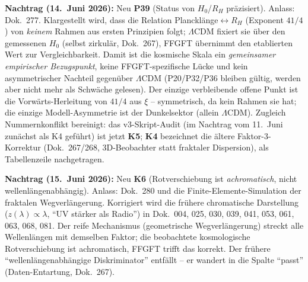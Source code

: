 \textbf{Nachtrag (14.~Juni 2026):} Neu \textbf{P39} (Status von $H_0$/$R_H$
präzisiert). Anlass: Dok.~277. Klargestellt wird, dass die Relation
Plancklänge$\leftrightarrow R_H$ (Exponent $41/4$) von \emph{keinem} Rahmen aus
ersten Prinzipien folgt; $\Lambda$CDM fixiert sie über den gemessenen $H_0$
(selbst zirkulär, Dok.~267), FFGFT übernimmt den etablierten Wert zur
Vergleichbarkeit. Damit ist die kosmische Skala ein \emph{gemeinsamer
empirischer Bezugspunkt}, keine FFGFT-spezifische Lücke und kein asymmetrischer
Nachteil gegenüber $\Lambda$CDM (P20/P32/P36 bleiben gültig, werden aber nicht
mehr als Schwäche gelesen). Der einzige verbleibende offene Punkt ist die
Vorwärts-Herleitung von $41/4$ aus $\xi$ -- symmetrisch, da kein Rahmen sie
hat; die einzige Modell-Asymmetrie ist der Dunkelsektor (allein $\Lambda$CDM).
Zugleich Nummernkonflikt bereinigt: das v3-Skript-Audit (im Nachtrag vom
11.~Juni zunächst als K4 geführt) ist jetzt \textbf{K5}; \textbf{K4} bezeichnet
die ältere Faktor-3-Korrektur (Dok.~267/268, 3D-Beobachter statt fraktaler
Dispersion), als Tabellenzeile nachgetragen.

\textbf{Nachtrag (15.~Juni 2026):} Neu \textbf{K6} (Rotverschiebung ist
\emph{achromatisch}, nicht wellenlängenabhängig). Anlass: Dok.~280 und die
Finite-Elemente-Simulation der fraktalen Wegverlängerung. Korrigiert wird die
frühere chromatische Darstellung ($z(\lambda)\propto\lambda$, \enquote{UV stärker
als Radio}) in Dok.~004, 025, 030, 039, 041, 053, 061, 063, 068, 081. Der reife
Mechanismus (geometrische Wegverlängerung) streckt alle Wellenlängen mit demselben
Faktor; die beobachtete kosmologische Rotverschiebung ist achromatisch, FFGFT
trifft das korrekt. Der frühere \enquote{wellenlängenabhängige Diskriminator}
entfällt -- er wandert in die Spalte \enquote{passt} (Daten-Entartung, Dok.~267).


